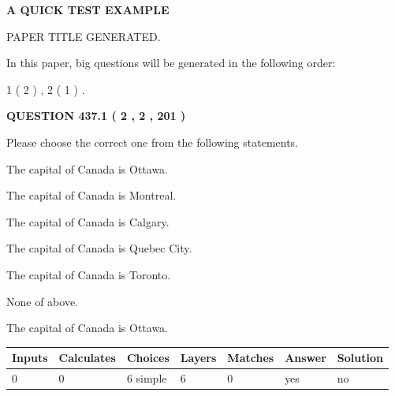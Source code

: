 \documentclass[12pt]{article}
\begin{document}
   
   
   
   
   
 \vspace{0.2in}
{\LARGE {\textbf{ A QUICK TEST EXAMPLE}}}
   
   
 PAPER TITLE GENERATED.
   
   
   
\vspace{0.2in}
   
In this paper, big questions will be generated in the following order: 
   
   
   1 ( 2 )
 ,
   2 ( 1 )
 .
  
\vspace{0.2in}
  
{\textbf{\Large{QUESTION
437.1 
 ( 2 , 2 , 201 )
}}}
  
  
Please choose the correct one from the following statements.
 
 
The capital of Canada is Ottawa.
 
 
The capital of Canada is Montreal.
 
 
The capital of Canada is Calgary.
 
 
The capital of Canada is Quebec City.
 
 
The capital of Canada is Toronto.
 
 
 None of above.
 
 
\noindent{}
 
 
The capital of Canada is Ottawa.
 
 
\noindent{}
 
 
   
   
   
   
\noindent\begin{tabular}{|l|l|l|l|l|l|l|}
 \hline
Inputs & Calculates & Choices & Layers & Matches & Answer & Solution \\ \hline
 0  & 
 0  & 
 6
  simple  
  & 
 6  & 
 0  & 
  yes & 
  no 
  \\ \hline
 \end{tabular}
   
   
   
\end{document}
